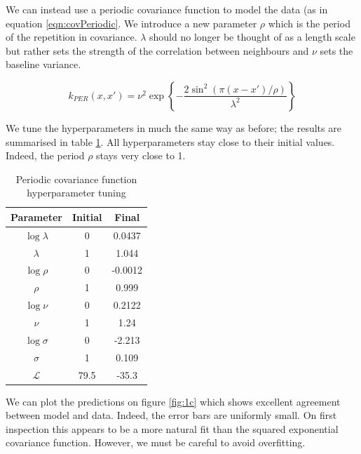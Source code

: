 \documentclass[]{article}
\newcommand{\Lcal}{\mathcal{L}}
\begin{document}
We can instead use a periodic covariance function to model the data (as in equation \ref{eqn:covPeriodic}. We introduce a new parameter $\rho$ which is the period of the repetition in covariance. $\lambda$ should no longer be thought of as a length scale but rather sets the strength of the correlation between neighbours and $\nu$ sets the baseline variance.

\begin{equation}
k_{PER}(x, x') = \nu^2 \exp
\left\{
- \frac{2 \sin ^2 \left( \pi (x-x') / \rho \right)}{\lambda^2}
\right\}
\label{eqn:covPeriodic}
\end{equation}

We tune the hyperparameters in much the same way as before; the results are summarised in table \ref{tab:per}. All hyperparameters stay close to their initial values. Indeed, the period $\rho$ stays very close to 1.

\begin{table}[!h]
\centering
\begin{tabular}{c | c c}
	\textbf{Parameter} & \textbf{Initial} & \textbf{Final} \\ \hline
	$\log \lambda$     & 0                & 0.0437         \\
	$\lambda$          & 1                & 1.044          \\
	$\log \rho$        & 0                & -0.0012        \\
	$\rho$             & 1                & 0.999          \\
	$\log \nu$         & 0                & 0.2122         \\
	$\nu$              & 1                & 1.24           \\ 
	$\log \sigma$      & 0                & -2.213         \\
	$\sigma$           & 1                & 0.109          \\ \hline
	$\Lcal$            & 79.5             & -35.3
\end{tabular}
\caption{Periodic covariance function hyperparameter tuning}
\label{tab:per}
\end{table}

We can plot the predictions on figure \ref{fig:1c} which shows excellent agreement between model and data. Indeed, the error bars are uniformly small. On first inspection this appears to be a more natural fit than the squared exponential covariance function. However, we must be careful to avoid overfitting.
\end{document}
